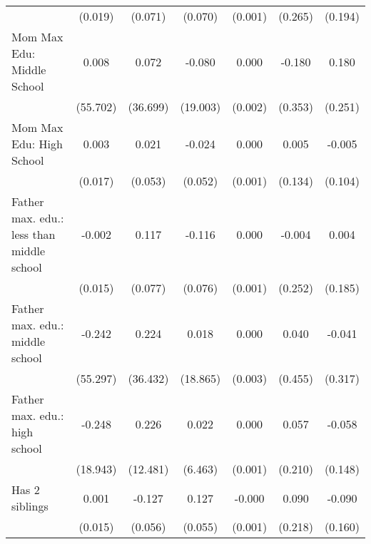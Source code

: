{\begin{tabular}{l*{6}{c}}
                    &     (0.019)         &     (0.071)         &     (0.070)         &     (0.001)         &     (0.265)         &     (0.194)         \\
\addlinespace
Mom Max Edu: Middle School&       0.008         &       0.072         &      -0.080         &       0.000         &      -0.180         &       0.180         \\
                    &    (55.702)         &    (36.699)         &    (19.003)         &     (0.002)         &     (0.353)         &     (0.251)         \\
\addlinespace
Mom Max Edu: High School&       0.003         &       0.021         &      -0.024         &       0.000         &       0.005         &      -0.005         \\
                    &     (0.017)         &     (0.053)         &     (0.052)         &     (0.001)         &     (0.134)         &     (0.104)         \\
\addlinespace
Father max. edu.: less than middle school&      -0.002         &       0.117         &      -0.116         &       0.000         &      -0.004         &       0.004         \\
                    &     (0.015)         &     (0.077)         &     (0.076)         &     (0.001)         &     (0.252)         &     (0.185)         \\
\addlinespace
Father max. edu.: middle school&      -0.242         &       0.224         &       0.018         &       0.000         &       0.040         &      -0.041         \\
                    &    (55.297)         &    (36.432)         &    (18.865)         &     (0.003)         &     (0.455)         &     (0.317)         \\
\addlinespace
Father max. edu.: high school&      -0.248         &       0.226         &       0.022         &       0.000         &       0.057         &      -0.058         \\
                    &    (18.943)         &    (12.481)         &     (6.463)         &     (0.001)         &     (0.210)         &     (0.148)         \\
\addlinespace
Has 2 siblings      &       0.001         &      -0.127\sym{*}  &       0.127\sym{*}  &      -0.000         &       0.090         &      -0.090         \\
                    &     (0.015)         &     (0.056)         &     (0.055)         &     (0.001)         &     (0.218)         &     (0.160)         \\

\end{tabular}}
